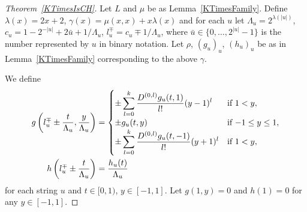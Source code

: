 \begin{proof}[Theorem~\ref{KTimesIsCH}]
Let $L$ and $\mu$ be as Lemma~\ref{KTimesFamily}.
Define
$
  \lambda(x) = 2x + 2
$, $
  \gamma(x) = \mu(x, x) + x \lambda(x)
$
and for each $u$ let
$
 \Lambda_u = 2^{\lambda(|u|)}
$, $
 c_u = 1-{2^{-|u|}}+{2\bar{u}+1}/{\Lambda_u}
$, $
 l_u^\mp = c_u\mp{1}/{\Lambda_u}
$,
 where $\bar u \in \{0, \dots, 2^{|u|} - 1\}$ is the number represented by $u$ in binary notation.
Let $\rho$, $(g_u)_u$, $(h_u)_u$ be as in Lemma~\ref{KTimesFamily} 
corresponding to the above $\gamma$.

We define
 \begin{align} \label{eq:g}
 g \left(l^\mp_u \pm \frac{t}{\Lambda_u}, \frac{y}{\Lambda_u}\right)
  &= \begin{cases}
      \pm \displaystyle \sum_{l=0}^k \frac{D^{(0,l)}g_u(t,1)}{l!} (y-1)^l 
      &  \text{if} \ 1<y, \\
      \pm g_u(t, y)      & \text{if} \ {-1} \le y \le 1, \\
      \pm \displaystyle \sum_{l=0}^k \frac{D^{(0,l)}g_u(t,-1)}{l!} (y+1)^l  
      &  \text{if} \ 1<y, \\
    \end{cases} 
  \\
 h \left( l^\mp_u \pm \frac{t}{\Lambda_u} \right) 
  & = \frac{h_u(t)}{\Lambda_u}
\end{align}
for each string $u$ and $t \in [0,1)$, $y \in [-1, 1]$.
Let $g(1,y) = 0$ and $h(1) = 0$ for any $y \in [-1,1]$.


\end{proof}
